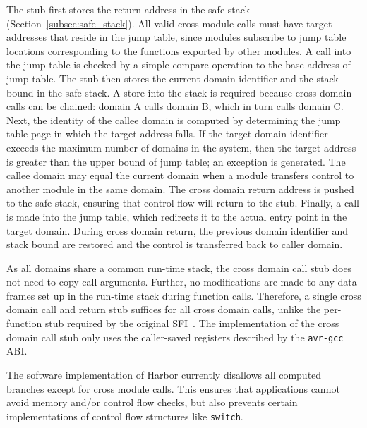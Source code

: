 The stub first stores the return address in the safe stack (Section~\ref{subsec:safe_stack}).
%
%
All valid cross-module calls must have target addresses that reside in the
jump table, since
%
modules subscribe to jump table locations
corresponding to the functions exported by other modules.
%
A call into the jump table is checked by a simple compare operation to
the base address of jump table.
%
%
The stub then stores the current domain identifier and the stack bound
in the safe stack.
%
A store into the stack is required because cross domain calls can be
chained: domain A calls domain B, which in turn calls domain C.
%
Next, the identity of the callee domain is computed by determining
the jump table page in which the target address falls.
%
%
If the target domain identifier exceeds the maximum number of domains
in the system, then the target address is greater
than the upper bound of jump table; an exception is generated.
%
The callee domain may equal the current domain when a module transfers
control to another module in the same domain.
%
The cross domain return address is pushed to the safe stack, ensuring that
%
control flow will return to the stub.
%
Finally, a call is made into the jump table, which redirects it to the
actual entry point in the target domain.
%
During cross domain return, the previous domain identifier and stack
bound are restored and the control is transferred back to caller
domain.
%

As all domains share a common run-time stack, the cross
domain call stub does not need to copy call arguments.
%
Further, no modifications are made to any data frames set up in the run-time
stack during function calls.
%
Therefore, a single cross domain call and return stub suffices for
all cross domain calls, unlike the per-function stub required by the
original SFI~\cite{wahbe93sfi}.
%
The implementation of the cross domain call stub only uses the
caller-saved registers described by the \texttt{avr-gcc} ABI.
%

The software implementation of Harbor currently disallows all computed
branches except for cross module calls.  
%
This ensures that applications cannot avoid memory and/or control flow
checks, but also prevents certain implementations of control flow
structures like \texttt{switch}.
%
